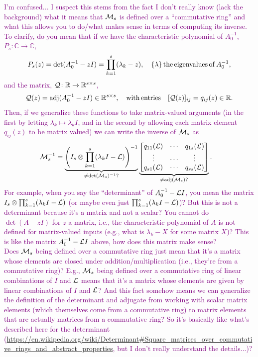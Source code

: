\documentclass[review]{siamart}
\newcommand{\tcp}{\textcolor{purple}}
\begin{document}
\tcp{
I'm confused... I suspect this stems from the fact I don't really know (lack the background) what it means  that ${\cal M}_s$ is defined over a  ``commutative ring'' and what this allows you to do/what makes sense in terms of computing its inverse.
To clarify, do you mean that if we have the characteristic polynomial of $A_0^{-1}$, $P_s \colon \mathbb{C} \to \mathbb{C}$,
\[
P_s(z) = \det(A_0^{-1} - z I) = \prod_{k = 1}^s (\lambda_k - z), \quad \{\lambda\} {\rm \, the\, eigenvalues\, of\, }A_0^{-1},
\] 
and the matrix, ${\cal Q} \colon \mathbb{R} \to \mathbb{R}^{s \times s}$,
\[
\mathcal{Q}(z) = {\rm adj}(A_{0}^{-1} - zI) \in \mathbb{R}^{s \times s}, \quad {\rm with\, entries} \quad [\mathcal{Q}(z)]_{ij} = q_{ij}(z) \in \mathbb{R}.
\] 
Then, if we generalize these functions to take matrix-valued arguments (in the first by letting $\lambda_k \mapsto \lambda_k I$, and in the second by allowing each matrix element $q_{ij}(z)$ to be matrix valued) we can write the inverse of ${\cal M}_s$ as 
\begin{align*}
\mathcal{M}_s^{-1} 
&= \underbrace{\left( I_s \otimes \prod_{k = 1}^s (\lambda_k I - {\cal L}) \right)^{-1}}_{\neq \det({\cal M}_s)^{-1}?}
\underbrace{\begin{bmatrix}
q_{11} ({\cal L}) & \cdots & q_{1s}({\cal L}) \\
\vdots & \cdots & \vdots \\
q_{s1} ({\cal L}) & \cdots & q_{ss}({\cal L}) 
\end{bmatrix}}_{\neq {\rm adj}({\cal M}_s)?}.
\end{align*}
For example, when you say the ``determinant'' of $A_0^{-1} - {\cal L} I$, you mean the matrix $  I_s \otimes \prod_{k = 1}^s (\lambda_k I - {\cal L}) $ (or maybe even just $\prod_{k = 1}^s (\lambda_k I - {\cal L})$)? But this is not a determinant because it's a matrix and not a scalar? You cannot do $\det(A - z I)$ for $z$ a matrix, i.e., the characteristic polynomial of $A$ is not defined for matrix-valued inputs (e.g., what is $\lambda_k - {X}$ for some matrix $X$)? This is like the matrix $A_0^{-1} - {\cal L}I$ above, how does this matrix make sense?}\\

\tcp{
Does ${\cal M}_s$ being defined over a commutative ring just mean that it's a matrix whose elements are closed under addition/multiplication (i.e., they're from a commutative ring)? E.g., ${\cal M}_s$ being defined over a commutative ring of linear combinations of $I$ and ${\cal L}$ means that it's a matrix whose elements are given by linear combinations of $I$ and ${\cal L}$? And this fact somehow means we can generalize the definition of the determinant and adjugate from working with scalar matrix elements (which themselves come from a commutative ring) to matrix elements that are actually matrices from a commutative ring? So it's basically like what's described here for the determinant (\url{https://en.wikipedia.org/wiki/Determinant\#Square\_matrices\_over\_commutative\_rings\_and\_abstract\_properties}, but I  don't really understand the details...)?
}
\end{document}
